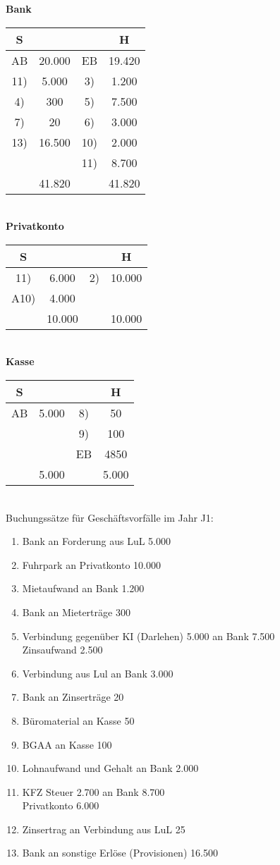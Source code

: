 \documentclass[paper=a4, fontsize=11pt]{scrartcl}
\numberwithin{equation}{section}
\numberwithin{figure}{section}
\numberwithin{table}{section}
\begin{document}
\textbf{Bank}
\begin{tabular}{cc|cc}
S & & & H \\\hline
AB & 20.000 & EB & 19.420 \\
11) & 5.000 & 3) & 1.200 \\
4) & 300 & 5) & 7.500 \\
7) & 20 & 6) & 3.000 \\
13) & 16.500 & 10) & 2.000 \\
  & & 11) & 8.700 \\\hline
  & 41.820 & & 41.820 \\\hline
\end{tabular} \\
\textbf{Privatkonto}
\begin{tabular}{cc|cc}
S & & & H \\\hline
11) & 6.000 & 2) & 10.000 \\
A10) & 4.000 & & \\\hline
  & 10.000 & & 10.000 \\\hline
\end{tabular} \\
\textbf{Kasse}
\begin{tabular}{cc|cc}
S & & & H \\\hline
AB & 5.000 & 8) & 50 \\
  & & 9) & 100 \\
  & & EB & 4850 \\\hline
  & 5.000 & & 5.000 \\\hline
\end{tabular} \\

Buchungssätze für Geschäftsvorfälle im Jahr J1: 
\begin{enumerate}
\item Bank an Forderung aus LuL 5.000
\item Fuhrpark an Privatkonto 10.000
\item Mietaufwand an Bank 1.200
\item Bank an Mieterträge 300
\item Verbindung gegenüber KI (Darlehen) 5.000 an Bank 7.500 \\
Zinsaufwand 2.500 
\item Verbindung aus Lul an Bank 3.000
\item Bank an Zinserträge 20
\item Büromaterial an Kasse 50
\item BGAA an Kasse 100
\item Lohnaufwand und Gehalt an Bank 2.000
\item KFZ Steuer 2.700 an Bank 8.700 \\
Privatkonto 6.000
\item Zinsertrag an Verbindung aus LuL 25
\item Bank an sonstige Erlöse (Provisionen) 16.500
\end{enumerate}
\end{document}
